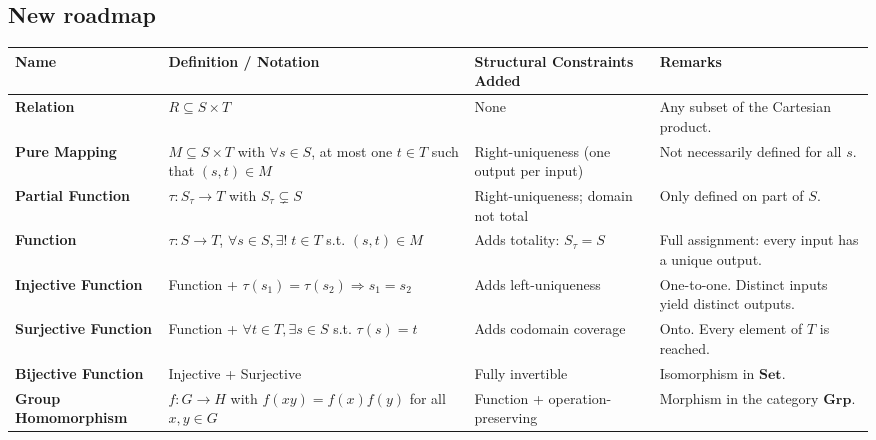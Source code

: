 \documentclass[10pt]{article}
\theoremstyle{plain}
\theoremstyle{definition}
\begin{document}
  \subsection*{New roadmap} 
  \begin{center}
  	\renewcommand{\arraystretch}{1.3}
  	\begin{tabular}{|l|p{6.5cm}|p{4.5cm}|p{4.2cm}|}
  		\hline
  		\textbf{Name} & \textbf{Definition / Notation} & \textbf{Structural Constraints Added} & \textbf{Remarks} \\
  		\hline
  		\textbf{Relation} &
  		$R \subseteq S \times T$ &
  		None &
  		Any subset of the Cartesian product. \\
  		
  		\textbf{Pure Mapping} &
  		$M \subseteq S \times T$ with $\forall s \in S$, at most one $t \in T$ such that $(s, t) \in M$ &
  		Right-uniqueness (one output per input) &
  		Not necessarily defined for all $s$. \\
  		
  		\textbf{Partial Function} &
  		$\tau: S_\tau \to T$ with $S_\tau \subsetneq S$ &
  		Right-uniqueness; domain not total &
  		Only defined on part of $S$. \\
  		
  		\textbf{Function} &
  		$\tau: S \to T$, $\forall s \in S, \exists! \; t \in T$ s.t. $(s, t) \in M$ &
  		Adds totality: $S_\tau = S$ &
  		Full assignment: every input has a unique output. \\
  		
  		\textbf{Injective Function} &
  		Function + $\tau(s_1) = \tau(s_2) \Rightarrow s_1 = s_2$ &
  		Adds left-uniqueness &
  		One-to-one. Distinct inputs yield distinct outputs. \\
  		
  		\textbf{Surjective Function} &
  		Function + $\forall t \in T, \exists s \in S$ s.t. $\tau(s) = t$ &
  		Adds codomain coverage &
  		Onto. Every element of $T$ is reached. \\
  		
  		\textbf{Bijective Function} &
  		Injective + Surjective &
  		Fully invertible &
  		Isomorphism in $\mathbf{Set}$. \\
  		
  		\textbf{Group Homomorphism} &
  		$f: G \to H$ with $f(xy) = f(x)f(y)$ for all $x, y \in G$ &
  		Function + operation-preserving &
  		Morphism in the category $\mathbf{Grp}$. \\
  		\hline
  	\end{tabular}
  \end{center}
  
  
  
  
\end{document}
